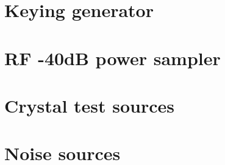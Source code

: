 \documentclass[10pt,letterpaper]{book}
\begin{document}
\section{Keying generator}
\section{RF -40dB power sampler}
\section{Crystal test sources}
\section{Noise sources}
\end{document}
